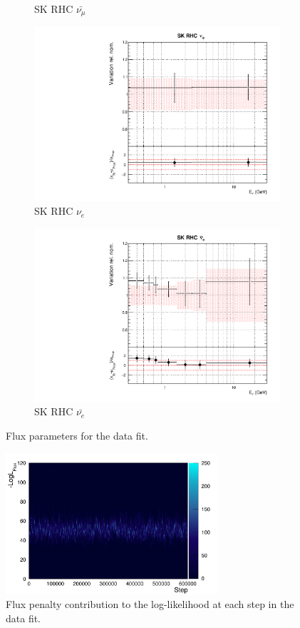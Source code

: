 \begin{figure}
\begin{subfigure}{0.24\textwidth}
  \caption{SK RHC $\bar{\nu_{\mu}}$}
\end{subfigure}
\begin{subfigure}{0.24\textwidth}
  \centering
  \includegraphics[width=0.95\linewidth]{figs/datflux14}
  \caption{SK RHC $\nu_{e}$}
\end{subfigure}
\begin{subfigure}{0.24\textwidth}
  \centering
  \includegraphics[width=0.95\linewidth]{figs/datflux15}
  \caption{SK RHC $\bar{\nu_e}$}
\end{subfigure}
\caption{Flux parameters for the data fit.}
\label{fig:datfluxSK}
\end{figure}

\begin{figure}
\centering
\includegraphics*[width=0.7\textwidth,clip]{figs/llh_fluxdat}
\caption{Flux penalty contribution to the log-likelihood at each step in the data fit.}\label{fig:llh_fluxdat}
\end{figure}

